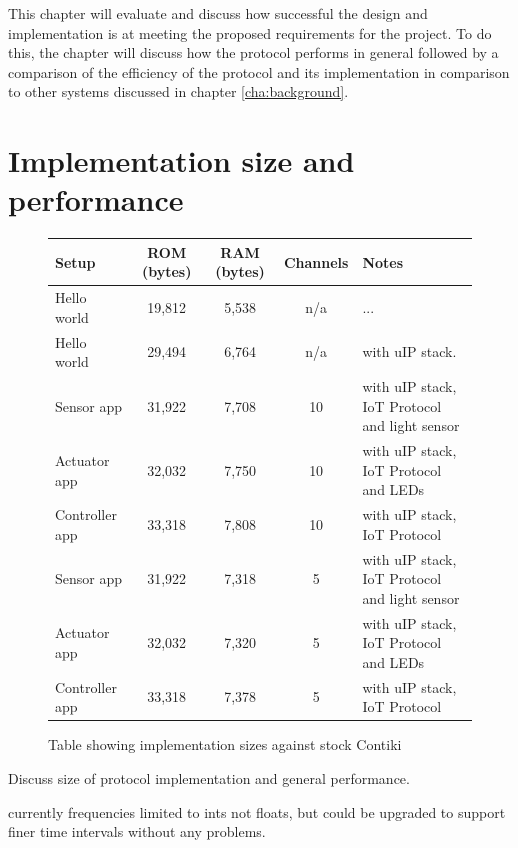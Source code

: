 This chapter will evaluate and discuss how successful the design and implementation is at meeting the proposed requirements for the project. To do this, the chapter will discuss how the protocol performs in general followed by a comparison of the efficiency of the protocol and its implementation in comparison to other systems discussed in chapter \ref{cha:background}.

\section{Implementation size and performance} %
\label{sec:implementation_size_and_performance}

\begin{figure}[h]
\begin{center}
    \begin{tabular}{| l | c | c | c | l |}
    \hline
    Setup & ROM (bytes) & RAM (bytes) & Channels & Notes \\ \hline
    Hello world & 19,812 & 5,538 & n/a &... \\ \hline
    Hello world & 29,494 & 6,764 & n/a & with uIP stack. \\ \hline
    Sensor app & 31,922 & 7,708 & 10 & with uIP stack, IoT Protocol and light sensor\\ \hline
    Actuator app & 32,032 & 7,750 & 10 & with uIP stack, IoT Protocol and LEDs \\ \hline
    Controller app & 33,318 & 7,808 & 10 & with uIP stack, IoT Protocol \\ \hline
    Sensor app & 31,922 & 7,318 & 5 & with uIP stack, IoT Protocol and light sensor\\ \hline
    Actuator app & 32,032 & 7,320 & 5 & with uIP stack, IoT Protocol and LEDs \\ \hline
    Controller app & 33,318 & 7,378 & 5 & with uIP stack, IoT Protocol \\ 
    \hline
    \end{tabular}
\end{center}
\caption{Table showing implementation sizes against stock Contiki}
\label{tab:size}
\end{figure}



Discuss size of protocol implementation and general performance.

currently frequencies limited to ints not floats, but could be upgraded to support finer time intervals without any problems.

